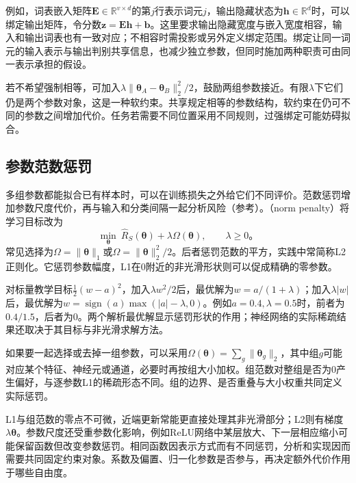 例如，词表嵌入矩阵$\bm E\in\mathbb R^{v\times d}$的第$j$行表示词元$j$，输出隐藏状态为$\bm h\in\mathbb R^d$时，可以绑定输出矩阵，令分数$\bm z=\bm E\bm h+\bm b$。这里要求输出隐藏宽度与嵌入宽度相容，输入和输出词表也有一致对应；不相容时需投影或另外定义绑定范围。绑定让同一词元的输入表示与输出判别共享信息，也减少独立参数，但同时施加两种职责可由同一表示承担的假设。

若不希望强制相等，可加入$\lambda\lVert\bm\theta_A-\bm\theta_B\rVert_2^2/2$，鼓励两组参数接近。有限$\lambda$下它们仍是两个参数对象，这是一种软约束。共享规定相等的参数结构，软约束在仍可不同的参数之间增加代价。任务若需要不同位置采用不同规则，过强绑定可能妨碍拟合。

\subsection{参数范数惩罚}
\label{sec:generalization-norm-penalties}

多组参数都能拟合已有样本时，可以在训练损失之外给它们不同评价。范数惩罚增加参数尺度代价，再与输入和分类间隔一起分析风险（参考）。（norm penalty）将学习目标改为
\begin{equation}
  \min_{\bm\theta}\ \hat R_S(\bm\theta)+\lambda\Omega(\bm\theta),
  \qquad\lambda\geq0\text{。}
  \label{eq:generalization-regularized-objective}
\end{equation}
常见选择为$\Omega=\lVert\bm\theta\rVert_1$或$\Omega=\lVert\bm\theta\rVert_2^2/2$。后者惩罚范数的平方，实践中常简称L2正则化。它惩罚参数幅度，L1在0附近的非光滑形状则可以促成精确的零参数。

\begin{example}[L1与L2的收缩不同]
  \label{ex:generalization-shrinkage}
  对标量教学目标$\tfrac12(w-a)^2$，加入$\lambda w^2/2$后，最优解为$w=a/(1+\lambda)$；加入$\lambda|w|$后，最优解为$w=\operatorname{sign}(a)\max(|a|-\lambda,0)$。例如$a=0.4,\lambda=0.5$时，前者为$0.4/1.5$，后者为0。两个解析最优解显示惩罚形状的作用；神经网络的实际稀疏结果还取决于其目标与非光滑求解方法。
\end{example}

如果要一起选择或去掉一组参数，可以采用$\Omega(\bm\theta)=\sum_g\lVert\bm\theta_g\rVert_2$，其中组$g$可能对应某个特征、神经元或通道，必要时再按组大小加权。组范数对整组是否为0产生偏好，与逐参数L1的稀疏形态不同。组的边界、是否重叠与大小权重共同定义实际惩罚。

L1与组范数的零点不可微，近端更新常能更直接处理其非光滑部分；L2则有梯度$\lambda\bm\theta$。参数尺度还受重参数化影响，例如ReLU网络中某层放大、下一层相应缩小可能保留函数但改变参数惩罚。相同函数因表示方式而有不同惩罚，分析和实现因而需要共同固定约束对象。系数及偏置、归一化参数是否参与，再决定额外代价作用于哪些自由度。

